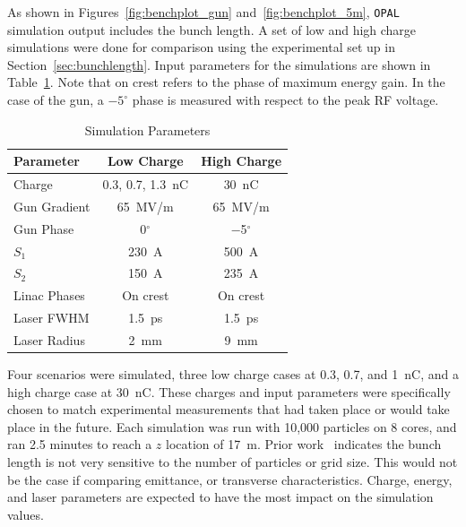 As shown in Figures~\ref{fig:benchplot_gun} and~\ref{fig:benchplot_5m}, 
\verb|OPAL| simulation output includes the bunch length.
A set of low and high charge simulations were done  
for comparison using the experimental set up in Section~\ref{sec:bunchlength}.
Input parameters for the simulations are shown in Table~\ref{simparam}.
Note that on crest refers to the phase of maximum energy gain.
In the case of the gun, a $-5^{\circ}$ phase is measured 
with respect to the peak RF voltage.
\begin{table}[hbt]
	\centering
	\caption{Simulation Parameters}
	\begin{tabular}{lcc}
		\toprule
		\toprule
		\textbf{Parameter} & \textbf{Low Charge}  & \textbf{High Charge} \\
		\midrule
		Charge       & 0.3, 0.7, \SI{1.3}{nC}        & \SI{30}{nC}    \\ %
		Gun Gradient & \SI{65}{MV/m}     & \SI{65}{MV/m}  \\ %
		Gun Phase    & \SI{0}{}$^{\circ}$ & \SI{-5}{}$^{\circ}$ \\		 
		$S_1$        & \SI{230}{A}		 & \SI{500}{A}	  \\
		$S_2$		 & \SI{150}{A}   	 & \SI{235}{A}		 \\
		Linac Phases & On crest          & On crest       \\
		Laser FWHM   & \SI{1.5}{ps}      & \SI{1.5}{ps}   \\ %
		Laser Radius & \SI{2}{mm}        & \SI{9}{mm}     \\
		\bottomrule
	\end{tabular}
	\label{simparam}
\end{table}

Four scenarios were simulated, three low charge cases at 0.3, 0.7, and \SI{1}{nC}, and a 
high charge case at \SI{30}{nC}. 
These charges and input parameters were specifically chosen to 
match experimental measurements that had taken place or would 
take place in the future. Each simulation was run with 10,000 particles 
on 8 cores, and ran 2.5 minutes to reach a $z$ location of \SI{17}{m}.
Prior work~\cite{benchmark} indicates the bunch length is not 
very sensitive to the number of particles or grid size. 
This would not be the case if comparing emittance, or 
transverse characteristics. Charge, energy, and laser parameters 
are expected to have the most impact on the simulation values.


